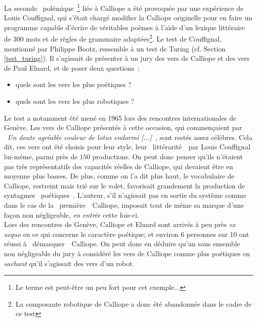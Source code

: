 \documentclass{article}
\begin{document}
					La seconde \guillemotleft~polémique~\guillemotright\footnote{Le terme est peut-être un peu fort pour cet exemple...} liée à Calliope a été provoquée par une expérience de Louis Couffignal, qui s'était chargé modifier la Calliope originelle pour en faire un programme capable d'écrire de véritables poèmes à l'aide d'un lexique littéraire de $300$ mots et de règles de grammaire adaptées\footnote{La composante robotique de Calliope a donc été abandonnée dans le cadre de ce test}. Le test de Couffignal, mentionné par Philippe Bootz, ressemble à un test de Turing (cf. Section \ref{test_turing}). Il s'agissait de présenter à un jury des vers de Calliope et des vers de Paul Eluard, et de poser deux questions~:
					\vspace{2mm}
					\begin{itemize}
						\item quels sont les vers les plus poétiques ?
						\item  quels sont les vers les plus robotiques ?
					\end{itemize}
					\vspace{2mm}
					Le test a notamment été mené en 1965 lors des rencontres internationales de Genève. Les vers de Calliope présentés à cette occasion, qui commençaient par \guillemotleft~\textit{Un doute agréable couleur de lotus endormi [...]~\guillemotright}, sont restés assez célèbres. Cela dit, ces vers ont été choisis pour leur style, leur \guillemotleft~littérarité~\guillemotright~par Louis Couffignal lui-même, parmi près de $150$ productions. On peut donc penser qu'ils n'étaient pas très représentatifs des capacités réelles de Calliope, qui devaient être en moyenne plus basses. De plus, comme on l'a dit plus haut, le vocabulaire de Calliope, restreint mais trié sur le volet, favorisait grandement la production de syntagmes \guillemotleft~poétiques~\guillemotright. L'auteur, s'il n'agissait pas en sortie du système comme dans le cas de la \guillemotleft~première~\guillemotright~Calliope, imposait tout de même sa marque d'une façon non négligeable, \textit{en entrée} cette fois-ci.\\
					
					Lors des rencontres de Genève, Calliope et Eluard sont arrivés à peu près \textit{ex aequo} en ce qui concerne le caractère poétique; et environ 6 personnes sur 10 ont réussi à \guillemotleft~démasquer~\guillemotright~Calliope. On peut donc en déduire qu'un sous ensemble non négligeable du jury à considéré les vers de Calliope comme plus poétiques en \textit{sachant} qu'il s'agissait des vers d'un robot.\\
					
\end{document}
